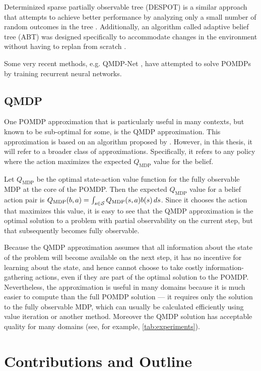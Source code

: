 Determinized sparse partially observable tree (DESPOT) is a similar approach that attempts to achieve better performance by analyzing only a small number of random outcomes in the tree \cite{somani2013despot}.
Additionally, an algorithm called adaptive belief tree (ABT) was designed specifically to accommodate changes in the environment without having to replan from scratch \cite{kurniawati2016online}.

Some very recent methods, e.g. QMDP-Net \cite{karkus2017qmdp}, have attempted to solve POMDPs by training recurrent neural networks.

\subsection{QMDP} \label{sec:qmdp}

One POMDP approximation that is particularly useful in many contexts, but known to be sub-optimal for some, is the QMDP approximation.
This approximation is based on an algorithm proposed by \citet{littman1995learning}.
However, in this thesis, it will refer to a broader class of approximations.
Specifically, it refers to any policy where the action maximizes the expected $Q_\text{MDP}$ value for the belief.

Let $Q_\text{MDP}$ be the optimal state-action value function for the fully observable MDP at the core of the POMDP.
Then the expected $Q_\text{MDP}$ value for a belief action pair is $Q_\text{MDP}(b,a) = \int_{s \in \mathcal{S}} Q_\text{MDP}(s,a) b(s) \, ds$.
Since it chooses the action that maximizes this value, it is easy to see that the QMDP approximation is the optimal solution to a problem with partial observability on the current step, but that subsequently becomes fully observable.

Because the QMDP approximation assumes that all information about the state of the problem will become available on the next step, it has no incentive for learning about the state, and hence cannot choose to take costly information-gathering actions, even if they are part of the optimal solution to the POMDP.
Nevertheless, the approximation is useful in many domains because it is much easier to compute than the full POMDP solution --- it requires only the solution to the fully observable MDP, which can usually be calculated efficiently using value iteration or another method.
Moreover the QMDP solution has acceptable quality for many domains (see, for example, \cref{tab:experiments}).

\section{Contributions and Outline}

